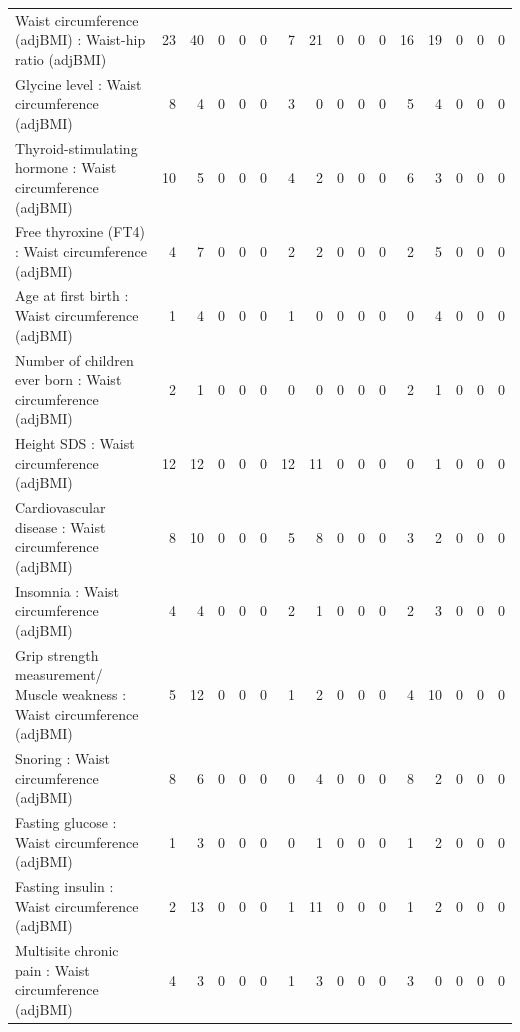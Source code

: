 \begin{table}[ht]
\begin{tabular}{lrrrrrrrrrrrrrrr}
  Waist circumference (adjBMI) : Waist-hip ratio (adjBMI) &  23 &  40 &   0 &   0 &   0 &   7 &  21 &   0 &   0 &   0 &  16 &  19 &   0 &   0 &   0 \\ 
  Glycine level  : Waist circumference (adjBMI) &   8 &   4 &   0 &   0 &   0 &   3 &   0 &   0 &   0 &   0 &   5 &   4 &   0 &   0 &   0 \\ 
  Thyroid-stimulating hormone  : Waist circumference (adjBMI) &  10 &   5 &   0 &   0 &   0 &   4 &   2 &   0 &   0 &   0 &   6 &   3 &   0 &   0 &   0 \\ 
  Free thyroxine (FT4) : Waist circumference (adjBMI) &   4 &   7 &   0 &   0 &   0 &   2 &   2 &   0 &   0 &   0 &   2 &   5 &   0 &   0 &   0 \\ 
  Age at first birth  : Waist circumference (adjBMI) &   1 &   4 &   0 &   0 &   0 &   1 &   0 &   0 &   0 &   0 &   0 &   4 &   0 &   0 &   0 \\ 
  Number of children ever born  : Waist circumference (adjBMI) &   2 &   1 &   0 &   0 &   0 &   0 &   0 &   0 &   0 &   0 &   2 &   1 &   0 &   0 &   0 \\ 
  Height SDS : Waist circumference (adjBMI) &  12 &  12 &   0 &   0 &   0 &  12 &  11 &   0 &   0 &   0 &   0 &   1 &   0 &   0 &   0 \\ 
  Cardiovascular disease : Waist circumference (adjBMI) &   8 &  10 &   0 &   0 &   0 &   5 &   8 &   0 &   0 &   0 &   3 &   2 &   0 &   0 &   0 \\ 
  Insomnia : Waist circumference (adjBMI) &   4 &   4 &   0 &   0 &   0 &   2 &   1 &   0 &   0 &   0 &   2 &   3 &   0 &   0 &   0 \\ 
  Grip strength measurement/ Muscle weakness : Waist circumference (adjBMI) &   5 &  12 &   0 &   0 &   0 &   1 &   2 &   0 &   0 &   0 &   4 &  10 &   0 &   0 &   0 \\ 
  Snoring : Waist circumference (adjBMI) &   8 &   6 &   0 &   0 &   0 &   0 &   4 &   0 &   0 &   0 &   8 &   2 &   0 &   0 &   0 \\ 
  Fasting glucose : Waist circumference (adjBMI) &   1 &   3 &   0 &   0 &   0 &   0 &   1 &   0 &   0 &   0 &   1 &   2 &   0 &   0 &   0 \\ 
  Fasting insulin : Waist circumference (adjBMI) &   2 &  13 &   0 &   0 &   0 &   1 &  11 &   0 &   0 &   0 &   1 &   2 &   0 &   0 &   0 \\ 
  Multisite chronic pain : Waist circumference (adjBMI) &   4 &   3 &   0 &   0 &   0 &   1 &   3 &   0 &   0 &   0 &   3 &   0 &   0 &   0 &   0 \\ 

\end{tabular}
\end{table}
